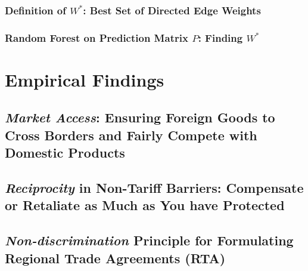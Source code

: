 \documentclass[12pt,letterpaper]{article}
\begin{document}
\subsubsection{Definition of $W^*$: Best Set of Directed Edge Weights} %

\subsubsection{Random Forest on Prediction Matrix $P$: Finding $W^*$} %



\section{Empirical Findings}\label{ef} %


\subsection{\textit{Market Access}: Ensuring Foreign Goods to Cross Borders and Fairly Compete with Domestic Products}\label{emp:ma}




\subsection{\textit{Reciprocity} in Non-Tariff Barriers: Compensate or Retaliate as Much as You have Protected}



\subsection{\textit{Non-discrimination} Principle for Formulating Regional Trade Agreements (RTA)}  %
\end{document}
